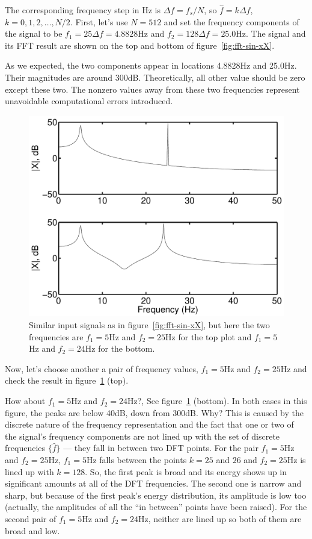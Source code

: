 The corresponding frequency step in Hz is $\Delta f=f_s/N$, so
$\hat{f}=k \Delta f$, $k=0, 1,2,\ldots, N/2$. First, let's use $N=512$
and set the frequency components of the signal to be $f_1=25 \Delta
f=4.8828$Hz and $f_2=128 \Delta f=25.0$Hz. The signal and its FFT
result are shown on the top and bottom of figure~\ref{fig:fft-sin-xX}.

As we expected, the two components appear in locations 4.8828Hz and
25.0Hz. Their magnitudes are around 300dB. Theoretically, all other
value should be zero except these two. The nonzero values away from
these two frequencies represent unavoidable computational errors
introduced.

\begin{figure}
\centerline{\includegraphics[width=5in]{ch-fft/fft-leakage}}
\caption[Sum of two sinusoids with 512 samples and its  
FFT; different frequencies]{Similar input signals as in
figure~\protect\ref{fig:fft-sin-xX}, but here the two frequencies are
$f_1=5$Hz and $f_2=25$Hz for the top plot and $f_1=5$Hz and $f_2=24$Hz
for the bottom.
\label{fig:fft-leakage}}
\end{figure}

Now, let's choose another a pair of frequency values, $f_1=5$Hz and
$f_2=25$Hz and check the result in figure~\ref{fig:fft-leakage} (top).

How about $f_1=5$Hz and $f_2=24$Hz?, See figure~\ref{fig:fft-leakage}
(bottom). In both cases in this figure, the peaks are below 40dB, down
from 300dB. Why? This is caused by the discrete nature of the
frequency representation and the fact that one or two of the signal's
frequency components are not lined up with the set of discrete
frequencies $\{\hat{f}\}$ --- they fall in between two DFT points. For
the pair $f_1=5$Hz and $f_2=25$Hz, $f_1=5$Hz falls between the points
$k=25$ and $26$ and $f_2=25$Hz is lined up with $k=128$. So, the first
peak is broad and its energy shows up in significant amounts at all of
the DFT frequencies.  The second one is narrow and sharp, but because
of the first peak's energy distribution, its amplitude is low too
(actually, the amplitudes of all the ``in between'' points have been
raised). For the second pair of $f_1=5$Hz and $f_2=24$Hz, neither are
lined up so both of them are broad and low.

